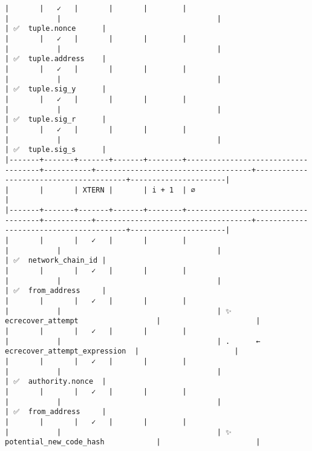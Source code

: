 \documentclass[varwidth=\maxdimen,margin=0.5cm,multi={verbatim}]{standalone}
\begin{document}
\begin{verbatim}
|       |   ✓   |       |       |        |                                    |           |                                    |                                        | ✅  tuple.nonce      |
|       |   ✓   |       |       |        |                                    |           |                                    |                                        | ✅  tuple.address    |
|       |   ✓   |       |       |        |                                    |           |                                    |                                        | ✅  tuple.sig_y      |
|       |   ✓   |       |       |        |                                    |           |                                    |                                        | ✅  tuple.sig_r      |
|       |   ✓   |       |       |        |                                    |           |                                    |                                        | ✅  tuple.sig_s      |
|-------+-------+-------+-------+--------+------------------------------------+-----------+------------------------------------+----------------------------------------+----------------------|
|       |       | XTERN |       | i + 1  | ∅                                  |
|-------+-------+-------+-------+--------+------------------------------------+-----------+------------------------------------+----------------------------------------+----------------------|
|       |       |   ✓   |       |        |                                    |           |                                    |                                        | ✅  network_chain_id |
|       |       |   ✓   |       |        |                                    |           |                                    |                                        | ✅  from_address     |
|       |       |   ✓   |       |        |                                    |           |                                    | ✨  ecrecover_attempt                  |                      |
|       |       |   ✓   |       |        |                                    |           |                                    | .      ← ecrecover_attempt_expression  |                      |
|       |       |   ✓   |       |        |                                    |           |                                    |                                        | ✅  authority.nonce  |
|       |       |   ✓   |       |        |                                    |           |                                    |                                        | ✅  from_address     |
|       |       |   ✓   |       |        |                                    |           |                                    | ✨  potential_new_code_hash            |                      |

\end{verbatim}
\end{document}
